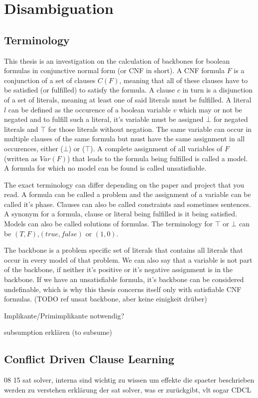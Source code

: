 \section{Disambiguation}
\subsection{Terminology}
This thesis is an investigation on the calculation of backbones for boolean formulas in conjunctive normal form (or CNF in short). A CNF formula $F$ is a conjunction of a set of clauses $C(F)$, meaning that all of these clauses have to be satisfied (or fulfilled) to satisfy the formula. A clause $c$ in turn is a disjunction of a set of literals, meaning at least one of said literals must be fulfilled. A literal $l$ can be defined as the occurence of a boolean variable $v$ which may or not be negated and to fulfill such a literal, it's variable must be assigned $\bot$ for negated literals and $\top$ for those literals without negation. The same variable can occur in multiple clauses of the same formula but must have the same assignment in all occurences, either ($\bot$) or ($\top$). A complete assignment of all variables of $F$ (written as $Var(F)$) that leads to the formula being fulfilled is called a model. A formula for which no model can be found is called unsatisfiable.



The exact terminology can differ depending on the paper and project that you read. A formula can be called a problem and the assignment of a variable can be called it's phase. Clauses can also be called constraints and sometimes sentences. A synonym for a formula, clause or literal being fulfilled is it being satisfied. Models can also be called solutions of formulas. The terminology for $\top$ or $\bot$ can be $(T,F)$,$(true,false)$ or $(1,0)$.



The backbone is a problem specific set of literals that contains all literals that occur in every model of that problem. We can also say that a variable is not part of the backbone, if neither it's positive or it's negative assignment is in the backbone. If we have an unsatisfiable formula, it's backbone can be considered undefinable, which is why this thesis concerns itself only with satisfiable CNF formulas. (TODO ref unsat backbone, aber keine einigkeit drüber)

Implikante/Primimplikante notwendig?

subsumption erklären (to subsume)

\subsection{Conflict Driven Clause Learning}
08 15 sat solver, interna sind wichtig zu wissen um effekte die spaeter beschrieben werden zu verstehen
erklärung der sat solver, was er zurückgibt, vlt sogar CDCL